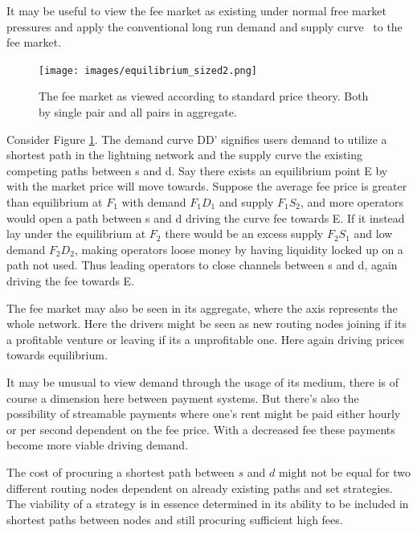 It may be useful to view the fee market as existing under normal free market pressures and apply the conventional long run demand and supply curve~\cite{boulding:evolutionary:economy} to the fee market. 

\begin{figure}[!htb]
	\hspace*{-0.3cm}
	\centering
	\texttt{[image: images/equilibrium\_sized2.png]}
	\caption{ The fee market as viewed according to standard price theory. Both by single pair and all pairs in aggregate. 
		}
		\label{fig:equilibrium}
		\hspace*{2mm} 	
\end{figure}

Consider Figure \ref{fig:equilibrium}. The demand curve DD' signifies users demand to utilize a shortest \gls{path} in the lightning network and the supply curve the existing competing paths between s and d. Say there exists an equilibrium point E by with the market price will move towards. Suppose the average fee price is greater than equilibrium at $F_{1}$ with demand $F_{1}D_{1}$ and supply $F_{1}S_{2}$, and more operators would open a path between s and d driving the curve fee towards E. If it instead lay under the equilibrium at $F_2$ there would be an excess supply $F_{2}S_{1}$ and low demand $F_{2}D_{2}$, making operators loose money by having liquidity locked up on a path not used. Thus leading operators to close channels between s and d, again driving the fee towards E.

The fee market may also be seen in its aggregate, where the axis represents the whole network. Here the drivers might be seen as new routing \gls{node}s joining if its a profitable venture or leaving if its a unprofitable one. Here again driving prices towards equilibrium. 

It may be unusual to view demand through the usage of its medium, there is of course a dimension here between payment systems. But there’s also the possibility of streamable payments where one’s rent might be paid either hourly or per second dependent on the fee price. With a decreased fee these payments become more viable driving demand.

The cost of procuring a shortest \gls{path} between $s$ and $d$ might not be equal for two different routing nodes dependent on already existing paths and set strategies. The viability of a strategy is in essence determined in its ability to be included in shortest paths between nodes and still procuring sufficient high fees.

